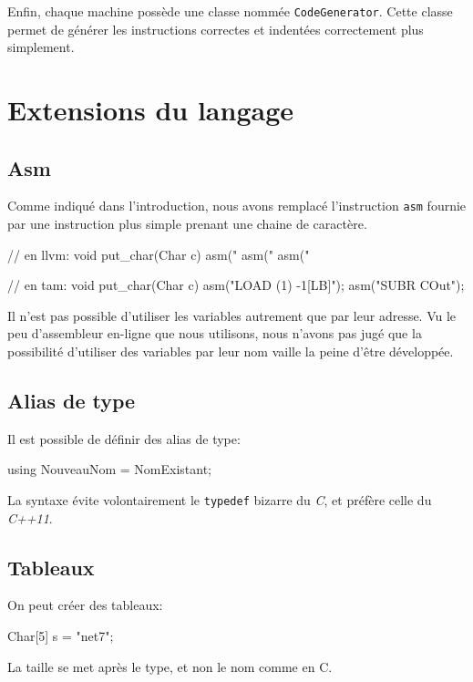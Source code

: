 \documentclass{scrartcl}
\begin{document}
  Enfin, chaque machine possède une classe nommée \verb+CodeGenerator+. Cette
  classe permet de générer les instructions correctes et indentées correctement
  plus simplement.

\section{Extensions du langage}
  \subsection{Asm}
    Comme indiqué dans l'introduction, nous avons remplacé l'instruction
    \verb+asm+ fournie par une instruction plus simple prenant une chaine de
    caractère.

    \begin{moccode}
// en llvm:
void put_char(Char c) {
    asm("%
    asm("%
    asm("%
}

// en tam:
void put_char(Char c) {
    asm("LOAD (1) -1[LB]");
    asm("SUBR COut");
}
    \end{moccode}

    Il n'est pas possible d'utiliser les variables autrement que par leur
    adresse. Vu le peu d'assembleur en-ligne que nous utilisons, nous n'avons
    pas jugé que la possibilité d'utiliser des variables par leur nom vaille la
    peine d'être développée.

  \subsection{Alias de type}\label{sec:alias}
    Il est possible de définir des alias de type:
    \begin{moccode}
using NouveauNom = NomExistant;
    \end{moccode}

    La syntaxe évite volontairement le \verb+typedef+ bizarre du \textit{C}, et
    préfère celle du \textit{C++11}.

  \subsection{Tableaux}\label{sec:tab}
    On peut créer des tableaux:
    \begin{moccode}
Char[5] s = "net7";
    \end{moccode}

    La taille se met après le type, et non le nom comme en C.
\end{document}
